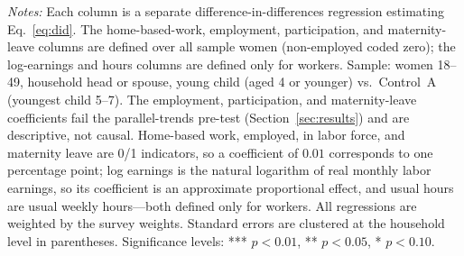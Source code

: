 \begin{table}[H]
   \par \raggedright 
   \footnotesize\textit{Notes:} Each column is a separate difference-in-differences regression estimating Eq.~\eqref{eq:did}. The home-based-work, employment, participation, and maternity-leave columns are defined over all sample women (non-employed coded zero); the log-earnings and hours columns are defined only for workers. Sample: women 18--49, household head or spouse, young child (aged 4 or younger) vs.\ Control~A (youngest child 5--7). The employment, participation, and maternity-leave coefficients fail the parallel-trends pre-test (Section~\ref{sec:results}) and are descriptive, not causal. Home-based work, employed, in labor force, and maternity leave are 0/1 indicators, so a coefficient of $0.01$ corresponds to one percentage point; log earnings is the natural logarithm of real monthly labor earnings, so its coefficient is an approximate proportional effect, and usual hours are usual weekly hours---both defined only for workers. All regressions are weighted by the survey weights. Standard errors are clustered at the household level in parentheses. Significance levels: *** $p<0.01$, ** $p<0.05$, * $p<0.10$.
\end{table}


